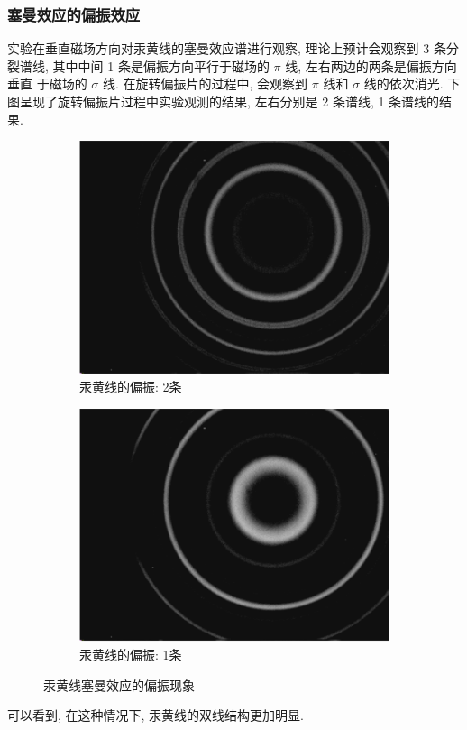 \documentclass[12pt,a4paper]{article}
\begin{document}
\subsubsection{塞曼效应的偏振效应}
实验在垂直磁场方向对汞黄线的塞曼效应谱进行观察, 理论上预计会观察到 3 条分
裂谱线, 其中中间 1 条是偏振方向平行于磁场的 $\pi$ 线, 左右两边的两条是偏振方向垂直
于磁场的 $\sigma$ 线. 在旋转偏振片的过程中, 会观察到 $\pi$ 线和 $\sigma$ 线的依次消光.
下图呈现了旋转偏振片过程中实验观测的结果, 左右分别是 2 条谱线, 1 条谱线的结果.
\begin{figure}[H]
    \centering
    \begin{subfigure}[b]{0.45\textwidth}
      \centering
      \includegraphics[width=\textwidth]{2yp.png}
      \caption{汞黄线的偏振: 2条}
    \end{subfigure}
    \hfill
    \begin{subfigure}[b]{0.45\textwidth}
      \centering
      \includegraphics[width=\textwidth]{1yp.png}
      \caption{汞黄线的偏振: 1条}
    \end{subfigure}
  \caption{汞黄线塞曼效应的偏振现象}
  \end{figure}
可以看到, 在这种情况下, 汞黄线的双线结构更加明显. 
\end{document}
